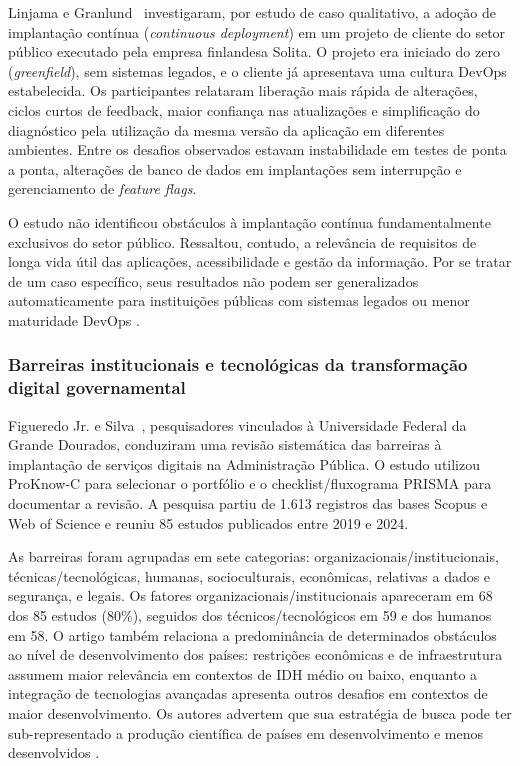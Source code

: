 Linjama e Granlund~ investigaram, por estudo de caso qualitativo, a adoção de implantação contínua (\emph{continuous deployment}) em um projeto de cliente do setor público executado pela empresa finlandesa Solita. O projeto era iniciado do zero (\emph{greenfield}), sem sistemas legados, e o cliente já apresentava uma cultura DevOps estabelecida. Os participantes relataram liberação mais rápida de alterações, ciclos curtos de feedback, maior confiança nas atualizações e simplificação do diagnóstico pela utilização da mesma versão da aplicação em diferentes ambientes. Entre os desafios observados estavam instabilidade em testes de ponta a ponta, alterações de banco de dados em implantações sem interrupção e gerenciamento de \emph{feature flags}.

O estudo não identificou obstáculos à implantação contínua fundamentalmente exclusivos do setor público. Ressaltou, contudo, a relevância de requisitos de longa vida útil das aplicações, acessibilidade e gestão da informação. Por se tratar de um caso específico, seus resultados não podem ser generalizados automaticamente para instituições públicas com sistemas legados ou menor maturidade DevOps \cite{linjama2026}.

\subsubsection{Barreiras institucionais e tecnológicas da transformação digital governamental}

Figueredo Jr. e Silva~, pesquisadores vinculados à Universidade Federal da Grande Dourados, conduziram uma revisão sistemática das barreiras à implantação de serviços digitais na Administração Pública. O estudo utilizou ProKnow-C para selecionar o portfólio e o checklist/fluxograma PRISMA para documentar a revisão. A pesquisa partiu de 1.613 registros das bases Scopus e Web of Science e reuniu 85 estudos publicados entre 2019 e 2024.

As barreiras foram agrupadas em sete categorias: organizacionais/institucionais, técnicas/tecnológicas, humanas, socioculturais, econômicas, relativas a dados e segurança, e legais. Os fatores organizacionais/institucionais apareceram em 68 dos 85 estudos (80\%), seguidos dos técnicos/tecnológicos em 59 e dos humanos em 58. O artigo também relaciona a predominância de determinados obstáculos ao nível de desenvolvimento dos países: restrições econômicas e de infraestrutura assumem maior relevância em contextos de IDH médio ou baixo, enquanto a integração de tecnologias avançadas apresenta outros desafios em contextos de maior desenvolvimento. Os autores advertem que sua estratégia de busca pode ter sub-representado a produção científica de países em desenvolvimento e menos desenvolvidos \cite{figueredo2026}.

